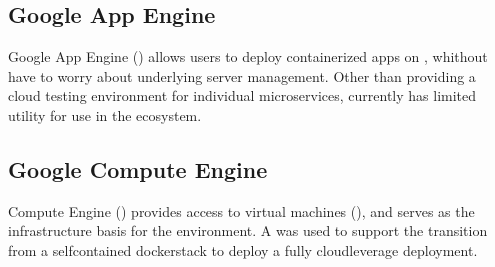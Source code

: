 \documentclass[letterpaper,12pt,english,openany,oneside]{sphinxmanual}
\begin{document}
\subsection{Google App Engine}
\label{\detokenize{euidev/infrastructure/index:google-app-engine}}
\sphinxAtStartPar
Google App Engine ({\hyperref[\detokenize{_static/glossary:term-GAE}]{}}) allows users to deploy containerized apps on {\hyperref[\detokenize{_static/glossary:term-GCP}]{}}, whithout have to worry about underlying server management. Other than providing a cloud testing environment for individual microservices, {\hyperref[\detokenize{_static/glossary:term-GAE}]{}} currently has limited utility for use in the {\hyperref[\detokenize{_static/glossary:term-RGVFlood.com}]{}} ecosystem.


\subsection{Google Compute Engine}
\label{\detokenize{euidev/infrastructure/index:google-compute-engine}}
\sphinxAtStartPar
{} Compute Engine ({\hyperref[\detokenize{_static/glossary:term-GCE}]{}}) provides access to virtual machines ({\hyperref[\detokenize{_static/glossary:term-VM}]{}}), and serves as the infrastructure basis for the {\hyperref[\detokenize{_static/glossary:term-GAE}]{}} environment. A {\hyperref[\detokenize{_static/glossary:term-GCE}]{}} {\hyperref[\detokenize{_static/glossary:term-VM}]{}} was used to support the transition from a self\sphinxhyphen{}contained docker\sphinxhyphen{}stack to deploy a fully cloud\sphinxhyphen{}leverage {\hyperref[\detokenize{_static/glossary:term-RGVFlood.com}]{}} deployment.
\end{document}
